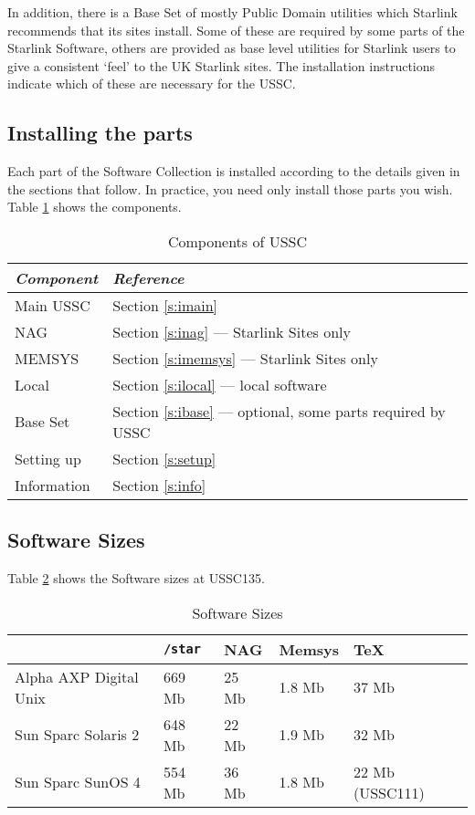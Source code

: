 In addition, there is a Base Set of mostly Public Domain utilities
which Starlink recommends that its sites install.  Some of these are
required by some parts of the Starlink Software, others are provided as
base level utilities for Starlink users to give a consistent `feel' to
the UK Starlink sites.  The installation instructions indicate which of
these are necessary for the USSC.

\subsection{Installing the parts}
\label{s:intro:insta}

Each part of the Software Collection is installed according to the details
given in the sections that follow.  In practice, you need only install
those parts you wish.  Table \ref{t:compo} shows the components.

\begin{table}[ht]
\begin{center}
\begin{tabular}{l|l}
{\em Component} & {\em Reference} \\ \hline \hline
Main USSC   & Section \ref{s:imain} \\
NAG         & Section \ref{s:inag} --- Starlink Sites only \\
MEMSYS      & Section \ref{s:imemsys} --- Starlink Sites only \\
Local       & Section \ref{s:ilocal} --- local software \\
Base Set    & Section \ref{s:ibase} --- optional, some parts required by USSC \\
Setting up  & Section \ref{s:setup} \\
Information & Section \ref{s:info} \\
\end{tabular}
\caption{Components of USSC}
\label{t:compo}
\end{center}
\end{table}

\subsection{Software Sizes}
\label{s:intro:sizes}

Table \ref{t:sizes} shows the Software sizes at USSC135.

\begin{table}[ht]
\begin{center}
\begin{tabular}{|l|l|l|l|l|} \hline
                       & {\tt /star} & NAG   & Memsys & \TeX\ \\ \hline \hline
Alpha AXP Digital Unix & 669 Mb      & 25 Mb & 1.8 Mb & 37 Mb \\
Sun Sparc Solaris 2    & 648 Mb      & 22 Mb & 1.9 Mb & 32 Mb \\
Sun Sparc SunOS 4      & 554 Mb      & 36 Mb & 1.8 Mb & 22 Mb (USSC111)\\
\hline
\end{tabular}
\caption{Software Sizes}
\label{t:sizes}
\end{center}
\end{table}

